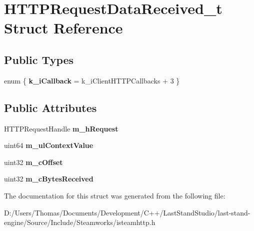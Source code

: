 \hypertarget{structHTTPRequestDataReceived__t}{}\section{H\+T\+T\+P\+Request\+Data\+Received\+\_\+t Struct Reference}
\label{structHTTPRequestDataReceived__t}
\subsection*{Public Types}
\begin{DoxyCompactItemize}
\item 
\hypertarget{structHTTPRequestDataReceived__t_a1fd47b716e640255a60362acca98fbf5}{}enum \{ {\bfseries k\+\_\+i\+Callback} = k\+\_\+i\+Client\+H\+T\+T\+P\+Callbacks + 3
 \}\label{structHTTPRequestDataReceived__t_a1fd47b716e640255a60362acca98fbf5}

\end{DoxyCompactItemize}
\subsection*{Public Attributes}
\begin{DoxyCompactItemize}
\item 
\hypertarget{structHTTPRequestDataReceived__t_a6e12c1532d58d976a7463334be5c04a8}{}H\+T\+T\+P\+Request\+Handle {\bfseries m\+\_\+h\+Request}\label{structHTTPRequestDataReceived__t_a6e12c1532d58d976a7463334be5c04a8}

\item 
\hypertarget{structHTTPRequestDataReceived__t_a1b39d1c0da68abec98eafafbc69d4394}{}uint64 {\bfseries m\+\_\+ul\+Context\+Value}\label{structHTTPRequestDataReceived__t_a1b39d1c0da68abec98eafafbc69d4394}

\item 
\hypertarget{structHTTPRequestDataReceived__t_a43e645007f5bc418b1526cb3e2671e6f}{}uint32 {\bfseries m\+\_\+c\+Offset}\label{structHTTPRequestDataReceived__t_a43e645007f5bc418b1526cb3e2671e6f}

\item 
\hypertarget{structHTTPRequestDataReceived__t_a7db829d0226f6da22c63fee1a3151f43}{}uint32 {\bfseries m\+\_\+c\+Bytes\+Received}\label{structHTTPRequestDataReceived__t_a7db829d0226f6da22c63fee1a3151f43}

\end{DoxyCompactItemize}


The documentation for this struct was generated from the following file\+:\begin{DoxyCompactItemize}
\item 
D\+:/\+Users/\+Thomas/\+Documents/\+Development/\+C++/\+Last\+Stand\+Studio/last-\/stand-\/engine/\+Source/\+Include/\+Steamworks/isteamhttp.\+h\end{DoxyCompactItemize}
